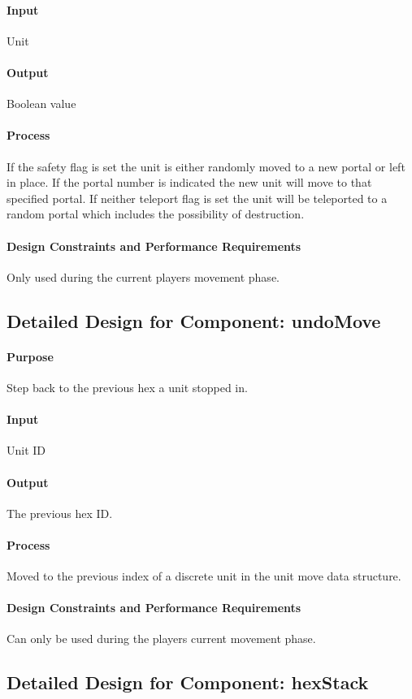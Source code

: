 \documentclass[12pt,a4paper,titlepage]{article}
\begin{document}
\paragraph{Input} Unit
\paragraph{Output} Boolean value
\paragraph{Process} If the safety flag is set the unit is either randomly moved to a new portal or left in place. If the portal number is indicated the new unit will move to that specified portal. If neither teleport flag is set the unit will be teleported to a random portal which includes the possibility of destruction.
\paragraph{Design Constraints and Performance Requirements} Only used during the current players movement phase.

\subsection{Detailed Design for Component: undoMove}
\paragraph{Purpose} Step back to the previous hex a unit stopped in.
\paragraph{Input} Unit ID
\paragraph{Output} The previous hex ID.
\paragraph{Process} Moved to the previous index of a discrete unit in the unit move data structure. 
\paragraph{Design Constraints and Performance Requirements} Can only be used during the players current movement phase.

\subsection{Detailed Design for Component: hexStack}
\end{document}

